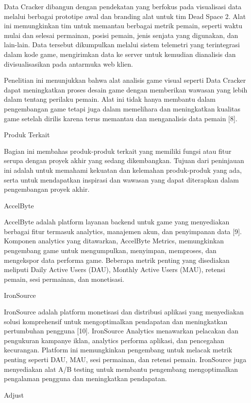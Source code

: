 Data Cracker dibangun dengan pendekatan yang berfokus pada visualisasi data melalui berbagai prototipe awal dan branding alat untuk tim Dead Space 2. Alat ini memungkinkan tim untuk memantau berbagai metrik pemain, seperti waktu mulai dan selesai permainan, posisi pemain, jenis senjata yang digunakan, dan lain-lain. Data tersebut dikumpulkan melalui sistem telemetri yang terintegrasi dalam kode game, mengirimkan data ke server untuk kemudian dianalisis dan divisualisasikan pada antarmuka web klien.

Penelitian ini menunjukkan bahwa alat analisis game visual seperti Data Cracker dapat meningkatkan proses desain game dengan memberikan wawasan yang lebih dalam tentang perilaku pemain. Alat ini tidak hanya membantu dalam pengembangan game tetapi juga dalam memelihara dan meningkatkan kualitas game setelah dirilis karena terus memantau dan menganalisis data pemain​ ​[8].

Produk Terkait

Bagian ini membahas produk-produk terkait yang memiliki fungsi atau fitur serupa dengan proyek akhir yang sedang dikembangkan. Tujuan dari peninjauan ini adalah untuk memahami kekuatan dan kelemahan produk-produk yang ada, serta untuk mendapatkan inspirasi dan wawasan yang dapat diterapkan dalam pengembangan proyek akhir.

AccelByte

AccelByte adalah platform layanan backend untuk game yang menyediakan berbagai fitur termasuk analytics, manajemen akun, dan penyimpanan data [9]. Komponen analytics yang ditawarkan, AccelByte Metrics, memungkinkan pengembang game untuk mengumpulkan, menyimpan, memproses, dan mengekspor data performa game. Beberapa metrik penting yang disediakan meliputi Daily Active Users (DAU), Monthly Active Users (MAU), retensi pemain, sesi permainan, dan monetisasi.

IronSource

IronSource adalah platform monetisasi dan distribusi aplikasi yang menyediakan solusi komprehensif untuk mengoptimalkan pendapatan dan meningkatkan pertumbuhan pengguna [10]. IronSource Analytics menawarkan pelacakan dan pengukuran kampanye iklan, analytics performa aplikasi, dan pencegahan kecurangan. Platform ini memungkinkan pengembang untuk melacak metrik penting seperti DAU, MAU, sesi permainan, dan retensi pemain. IronSource juga menyediakan alat A/B testing untuk membantu pengembang mengoptimalkan pengalaman pengguna dan meningkatkan pendapatan.

Adjust

